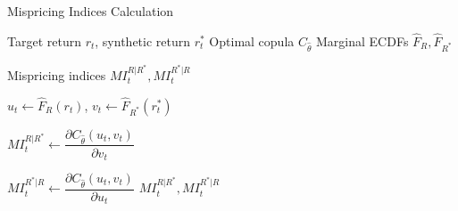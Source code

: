 \begin{algorithm}[H]
\caption{Mispricing Indices Calculation}
\label{alg:mispricing_indices}
\begin{algorithmic}[1]
\mx 
\Require
    \State Target return $r_t$, synthetic return $r_t^*$
    \State Optimal copula $C_{\hat{\theta}}$
    \State Marginal ECDFs $\hat{F}_R, \hat{F}_{R^*}$

\mx 
\Ensure Mispricing indices $MI_t^{R|R^*}, MI_t^{R^*|R}$

\mx 
{}
    \State $u_t \gets \hat{F}_R(r_t)$, $v_t \gets \hat{F}_{R^*}(r_t^*)$
    \Comment{\scalebox{0.9}{\textcolor{Grey_color}{Compute uniform marginals (pseudo-observations)}}}     

    \mx 
    \State $MI_t^{R|R^*} \gets \dfrac{\partial C_{\hat{\theta}}(u_t, v_t)}{\partial v_t}$
    \Comment{\scalebox{0.9}{\textcolor{Grey_color}{Compute target-synthetic MI}}}     
    
    \mx
    \State $MI_t^{R^*|R} \gets \dfrac{\partial C_{\hat{\theta}}(u_t, v_t)}{\partial u_t}$
    \Comment{\scalebox{0.9}{\textcolor{Grey_color}{Compute synthetic-target MI}}} 
    \mx 
    \State \Return $MI_t^{R|R^*}, MI_t^{R^*|R}$
    
\EndFunction
\end{algorithmic}
\end{algorithm}

